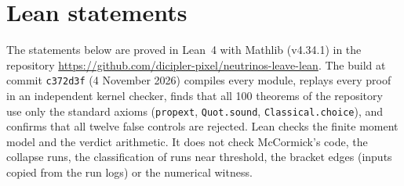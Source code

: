 \documentclass[11pt]{article}
\begin{document}
\section{Lean statements}
\sloppy
The statements below are proved in Lean~4 with Mathlib (v4.34.1) in the repository \url{https://github.com/dicipler-pixel/neutrinos-leave-lean}. The build at commit \texttt{c372d3f} (4 November 2026) compiles every module, replays every proof in an independent kernel checker, finds that all 100 theorems of the repository use only the standard axioms (\texttt{propext}, \texttt{Quot.sound}, \texttt{Classical.choice}), and confirms that all twelve false controls are rejected. Lean checks the finite moment model and the verdict arithmetic. It does not check McCormick's code, the collapse runs, the classification of runs near threshold, the bracket edges (inputs copied from the run logs) or the numerical witness.
\end{document}
